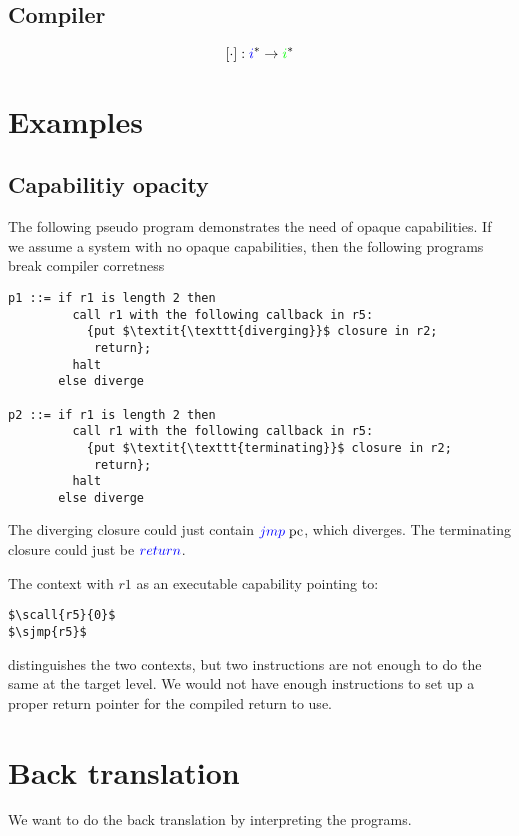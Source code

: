 \documentclass[a4paper]{article}
\newcommand{\fun}{\rightarrow}
\newcommand{\sourcecolor}[1]{\color{blue}}
\newcommand{\src}[1]{{\sourcecolor{} #1}}
\newcommand{\targetcolor}[1]{\color{green}}
\newcommand{\trg}[1]{{\targetcolor{} #1}}
\newcommand{\zinstr}[1]{#1}
\newcommand{\oneinstr}[2]{
  \ifthenelse{\equal{#2}{}}
  {\zinstr{#1}}
  {\zinstr{#1} \; #2}
}
\newcommand{\twoinstr}[3]{
  \ifthenelse{\equal{#2#3}{}}
  {\zinstr{#1}}
  {\zinstr{#1} \; #2 \; #3}
}
\newcommand{\sreturn}{\zinstr{\src{return}}}
\newcommand{\sjmp}[1]{\oneinstr{\src{jmp}}{#1}}
\newcommand{\scall}[2]{\twoinstr{\src{call}}{#1}{#2}}
\newcommand{\pcreg}{\mathrm{pc}}
\newcommand{\comp}[1]{[#1]}
\begin{document}
\subsection{Compiler}
\[
\comp{\cdot} : \src{i}^* \fun \trg{i}^*
\]
\clearpage
\section{Examples}
\subsection{Capabilitiy opacity}
The following pseudo program demonstrates the need of opaque capabilities. If we assume a system with no opaque capabilities, then the following programs break compiler corretness
\begin{lstlisting}[basicstyle=\sourcecolor{}\ttfamily] 
p1 ::= if r1 is length 2 then
         call r1 with the following callback in r5:
           {put $\textit{\texttt{diverging}}$ closure in r2;
            return};
         halt
       else diverge

p2 ::= if r1 is length 2 then
         call r1 with the following callback in r5:
           {put $\textit{\texttt{terminating}}$ closure in r2;
            return};
         halt
       else diverge
\end{lstlisting}
The diverging closure could just contain $\sjmp{\pcreg}$, which diverges. The terminating closure could just be $\sreturn$.

The context with $r1$ as an executable capability pointing to:
\begin{lstlisting}
$\scall{r5}{0}$
$\sjmp{r5}$
\end{lstlisting}
distinguishes the two contexts, but two instructions are not enough to do the same at the target level. We would not have enough instructions to set up a proper return pointer for the compiled return to use.

\clearpage
\section{Back translation}
We want to do the back translation by interpreting the programs.
\end{document}
